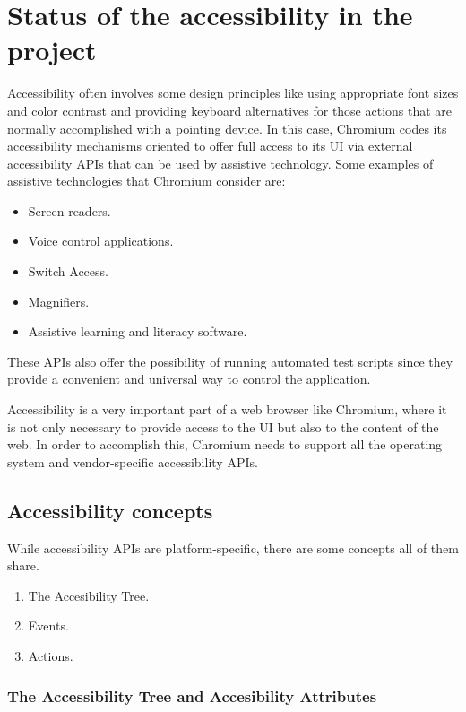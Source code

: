 \chapter{Status of the accessibility in the project}
\label{chap:accessibility}

Accessibility \cite{accessibility} often involves some design principles like using appropriate font sizes and color contrast and providing keyboard alternatives for those actions that are normally accomplished with a pointing device. In this case, Chromium codes its accessibility mechanisms oriented to offer full access to its UI via external accessibility APIs that can be used by assistive technology. Some examples of assistive technologies that Chromium consider are:
\begin{itemize}
    \item Screen readers.
    \item Voice control applications.
    \item Switch Access.
    \item Magnifiers.
    \item Assistive learning and literacy software.
\end{itemize}

These APIs also offer the possibility of running automated test scripts since they provide a convenient and universal way to control the application.

Accessibility is a very important part of a web browser like Chromium, where it is not only necessary to provide access to the UI but also to the content of the web. In order to accomplish this, Chromium needs to support all the operating system and vendor-specific accessibility APIs.


\section{Accessibility concepts}

While accessibility APIs are platform-specific, there are some concepts all of them share.
\begin{enumerate}
    \item The Accesibility Tree.
    \item Events.
    \item Actions.
\end{enumerate}

\subsection{The Accessibility Tree and Accesibility Attributes}


